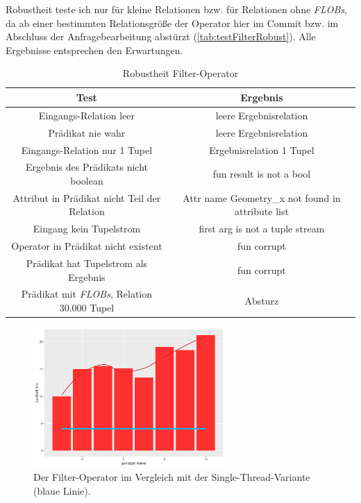 \documentclass[a4paper,12pt,twoside]{article}
\newcommand{\Fb}[1]{\textit{#1}} %
\begin{document}
{

Robustheit teste ich nur für kleine Relationen bzw. für Relationen ohne \Fb{FLOBs}, da ab einer bestimmten Relationsgröße der Operator hier im Commit bzw. im Abschluss der Anfragebearbeitung abstürzt (\autoref{tab:testFilterRobust}). Alle Ergebnisse entsprechen den Erwartungen.

\begin{table}
	\centering
	\begin{tabular}{|c|c|}
		\hline 
		Test & Ergebnis \\ 
		\hline
		Eingangs-Relation leer & leere Ergebnisrelation \\ 
		\hline
		Prädikat nie wahr & leere Ergebnisrelation \\ 
		\hline
		Eingangs-Relation nur 1 Tupel & Ergebnisrelation 1 Tupel \\ 
		\hline
		Ergebnis des Prädikats nicht boolean & fun result is not a bool \\ 
		\hline
		Attribut in Prädikat nicht Teil der Relation &  Attr name Geometry\_x not found in attribute list  \\ 
		\hline
		Eingang kein Tupelstrom & first arg is not a tuple stream \\ 
		\hline
		Operator in Prädikat nicht existent &  fun corrupt  \\ 
		\hline
		Prädikat hat Tupelstrom als Ergebnis & fun corrupt \\ 
		\hline
		Prädikat mit \Fb{FLOBs}, Relation 30.000 Tupel & Absturz \\ 
		\hline
	\end{tabular}
	\caption{\label{tab:testFilterRobust}Robustheit Filter-Operator}
\end{table}

\begin{figure}
	\centering
	\includegraphics[width=0.65\textwidth]{Bilder/filter_kerne.png}
	\caption{Der Filter-Operator im Vergleich mit der Single-Thread-Variante (blaue Linie).}
	\label{img:filterKern}
\end{figure}

}
\end{document}
